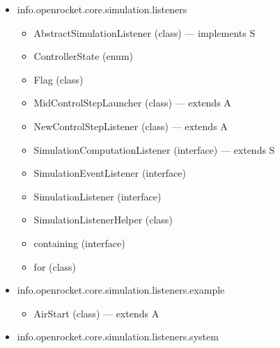 \documentclass{amsdtx}
\begin{document}
\begin{itemize}
\begin{itemize}
    \begin{itemize}
    
    \item
      API (interface)
    \item
      JavaCode (class) --- extends A
    \item
      JavaCodeProvider (class) --- extends A
    \item
      ScriptingExtension (class) --- extends A
    \item
      ScriptingProvider (class) --- extends A
    \item
      ScriptingSimulationListener (class) --- implements S
    \item
      ScriptingUtil (class)
    \item
      used (class)
    \end{itemize}
  \item
    info.openrocket.core.simulation.listeners

    \begin{itemize}
    
    \item
      AbstractSimulationListener (class) --- implements S
    \item
      ControllerState (enum)
    \item
      Flag (class)
    \item
      MidControlStepLauncher (class) --- extends A
    \item
      NewControlStepListener (class) --- extends A
    \item
      SimulationComputationListener (interface) --- extends S
    \item
      SimulationEventListener (interface)
    \item
      SimulationListener (interface)
    \item
      SimulationListenerHelper (class)
    \item
      containing (interface)
    \item
      for (class)
    \end{itemize}
  \item
    info.openrocket.core.simulation.listeners.example

    \begin{itemize}
    
    \item
      AirStart (class) --- extends A
    \end{itemize}
  \item
    info.openrocket.core.simulation.listeners.system


\end{itemize}
\end{itemize}
\end{document}
